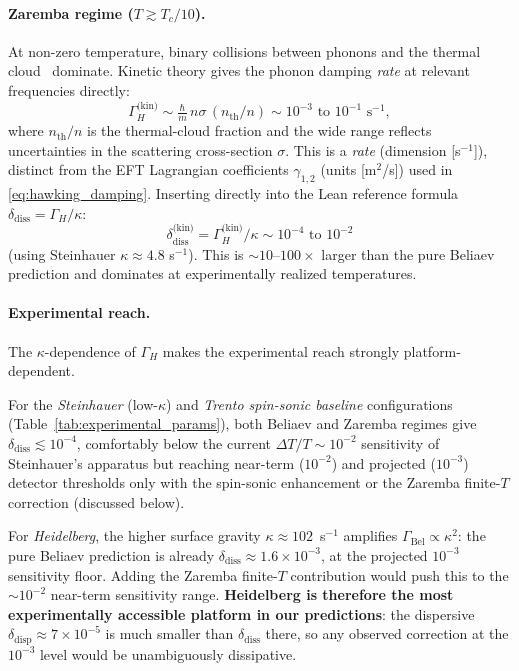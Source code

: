 \documentclass[aps,prl,twocolumn,superscriptaddress,nofootinbib,amsmath,amssymb]{revtex4-2}
\begin{document}
\paragraph*{Zaremba regime ($T \gtrsim T_c/10$).}
At non-zero temperature, binary collisions between phonons and the
thermal cloud~\cite{Zaremba1999} dominate. Kinetic theory gives the
phonon damping \emph{rate} at relevant frequencies directly:
\begin{equation}
\label{eq:gamma_estimates_expanded}
\Gamma_H^{\text{(kin)}} \sim \tfrac{\hbar}{m}\, n \sigma\, (n_{\text{th}}/n)
  \sim 10^{-3} \text{ to } 10^{-1} \text{ s}^{-1},
\end{equation}
where $n_{\text{th}}/n$ is the thermal-cloud fraction and the wide range
reflects uncertainties in the scattering cross-section $\sigma$. This is
a \emph{rate} (dimension [s$^{-1}$]), distinct from the EFT Lagrangian
coefficients $\gamma_{1,2}$ (units [m$^2$/s]) used in
\eqref{eq:hawking_damping}. Inserting directly into the Lean reference
formula $\delta_{\mathrm{diss}} = \Gamma_H/\kappa$:
\begin{equation}
\label{eq:delta_diss_zaremba}
\delta_{\text{diss}}^{\text{(kin)}} = \Gamma_H^{\text{(kin)}}/\kappa
  \sim 10^{-4} \text{ to } 10^{-2}
\end{equation}
(using Steinhauer $\kappa \approx 4.8$ s$^{-1}$). This is $\sim 10$--$100\times$
larger than the pure Beliaev prediction and dominates at experimentally
realized temperatures.

\paragraph*{Experimental reach.} The $\kappa$-dependence of $\Gamma_H$ makes
the experimental reach strongly platform-dependent.

For the \emph{Steinhauer} (low-$\kappa$) and \emph{Trento spin-sonic baseline}
configurations (Table~\ref{tab:experimental_params}), both Beliaev and Zaremba
regimes give $\delta_{\text{diss}} \lesssim 10^{-4}$, comfortably below the current
$\Delta T/T \sim 10^{-2}$ sensitivity of Steinhauer's apparatus but reaching
near-term ($10^{-2}$) and projected ($10^{-3}$) detector thresholds only with the
spin-sonic enhancement or the Zaremba finite-$T$ correction (discussed below).

For \emph{Heidelberg}, the higher surface gravity $\kappa \approx 102$~s$^{-1}$
amplifies $\Gamma_{\mathrm{Bel}} \propto \kappa^2$: the pure Beliaev prediction is
already $\delta_{\text{diss}} \approx 1.6\times 10^{-3}$, at the projected
$10^{-3}$ sensitivity floor. Adding the Zaremba finite-$T$ contribution would
push this to the $\sim 10^{-2}$ near-term sensitivity range. \textbf{Heidelberg
is therefore the most experimentally accessible platform in our predictions}:
the dispersive $\delta_{\text{disp}} \approx 7\times 10^{-5}$ is much smaller than
$\delta_{\text{diss}}$ there, so any observed correction at the $10^{-3}$ level
would be unambiguously dissipative.
\end{document}
